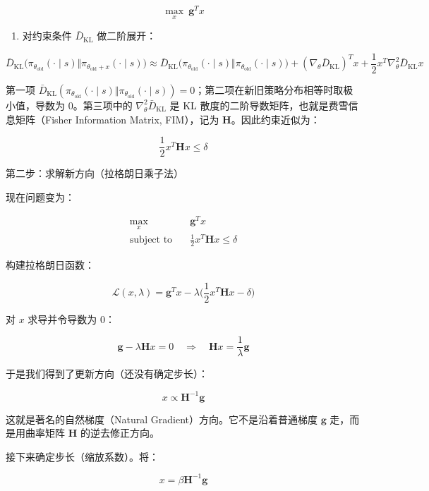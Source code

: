 \[
\max_x\ \mathbf{g}^{T}x
\]

\begin{enumerate}
\def\labelenumi{\arabic{enumi}.}
\setcounter{enumi}{1}
\tightlist
\item
  对约束条件 \(\bar{D}_{\mathrm{KL}}\) 做二阶展开：
\end{enumerate}

\[
\bar{D}_{\mathrm{KL}}\bigl(
\pi_{\theta_{\mathrm{old}}}(\cdot\mid s)
\Vert
\pi_{\theta_{\mathrm{old}}+x}(\cdot\mid s)
\bigr)
\approx
\bar{D}_{\mathrm{KL}}\bigl(
\pi_{\theta_{\mathrm{old}}}(\cdot\mid s)
\Vert
\pi_{\theta_{\mathrm{old}}}(\cdot\mid s)
\bigr)
+
(\nabla_\theta \bar{D}_{\mathrm{KL}})^{T} x
+
\frac{1}{2}x^{T}\nabla_\theta^{2}\bar{D}_{\mathrm{KL}}x
\]

第一项 \(\bar{D}_{\mathrm{KL}}(\pi_{\theta_{\mathrm{old}}}(\cdot\mid s)\Vert\pi_{\theta_{\mathrm{old}}}(\cdot\mid s))=0\)；第二项在新旧策略分布相等时取极小值，导数为 \(0\)。第三项中的 \(\nabla_\theta^{2}\bar{D}_{\mathrm{KL}}\) 是 KL 散度的二阶导数矩阵，也就是费雪信息矩阵（Fisher Information Matrix, FIM），记为 \(\mathbf{H}\)。因此约束近似为：

\[
\frac{1}{2}x^{T}\mathbf{H}x\le \delta
\]

第二步：求解新方向（拉格朗日乘子法）

现在问题变为：

\[
\begin{aligned}
\max_x\quad
& \mathbf{g}^{T}x \\
\text{subject to}\quad
& \frac{1}{2}x^{T}\mathbf{H}x\le \delta
\end{aligned}
\]

构建拉格朗日函数：

\[
\mathcal{L}(x,\lambda)=
\mathbf{g}^{T}x
-\lambda
\bigl(
\frac{1}{2}x^{T}\mathbf{H}x-\delta
\bigr)
\]

对 \(x\) 求导并令导数为 \(0\)：

\[
\mathbf{g}-\lambda\mathbf{H}x=0
\quad\Longrightarrow\quad
\mathbf{H}x=\frac{1}{\lambda}\mathbf{g}
\]

于是我们得到了更新方向（还没有确定步长）：

\[
x\propto\mathbf{H}^{-1}\mathbf{g}
\]

这就是著名的自然梯度（Natural Gradient）方向。它不是沿着普通梯度 \(\mathbf{g}\) 走，而是用曲率矩阵 \(\mathbf{H}\) 的逆去修正方向。

接下来确定步长（缩放系数）。将：

\[
x=\beta\mathbf{H}^{-1}\mathbf{g}
\]

